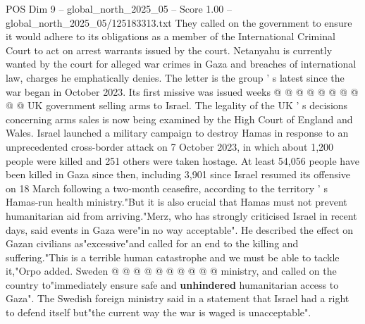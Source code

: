 \begin{textsample}{POS Dim 9 – global\_north\_2025\_05 – Score 1.00 – global\_north\_2025\_05/125183313.txt}
They called on the government to ensure it would adhere to its obligations as a member of the International Criminal Court to act on arrest warrants issued by the court.
Netanyahu is currently wanted by the court for alleged war crimes in Gaza and breaches of international law, charges he emphatically denies.
The letter is the group ' s latest since the war began in October 2023.
Its first missive was issued weeks @ @ @ @ @ @ @ @ @ @ UK government selling arms to Israel.
The legality of the UK ' s decisions concerning arms sales is now being examined by the High Court of England and Wales.
Israel launched a military campaign to destroy Hamas in response to an unprecedented cross-border attack on 7 October 2023, in which about 1,200 people were killed and 251 others were taken hostage.
At least 54,056 people have been killed in Gaza since then, including 3,901 since Israel resumed its offensive on 18 March following a two-month ceasefire, according to the territory ' s Hamas-run health ministry."But it is also crucial that Hamas must not prevent humanitarian aid from arriving."Merz, who has strongly criticised Israel in recent days, said events in Gaza were"in no way acceptable".
He described the effect on Gazan civilians as"excessive"and called for an end to the killing and suffering."This is a terrible human catastrophe and we must be able to tackle it,"Orpo added.
Sweden @ @ @ @ @ @ @ @ @ @ ministry, and called on the country to"immediately ensure safe and \textbf{unhindered} humanitarian access to Gaza".
The Swedish foreign ministry said in a statement that Israel had a right to defend itself but"the current way the war is waged is unacceptable".

\end{textsample}
